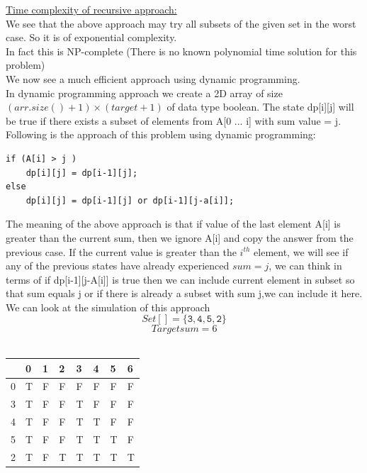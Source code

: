 \documentclass[12pt]{book}
\begin{document}
\underline{Time complexity of recursive approach:}\\
We see that the above approach may try all subsets of the given set in the worst case. So it is of exponential complexity.\\
In fact this is NP-complete (There is no known polynomial time solution for this problem)\\

We now see a much efficient approach using dynamic programming.\\
In dynamic programming approach we create a 2D array of size $(arr.size()+1) \times (target+1)$ of data type boolean. The state dp[i][j] will be true if there exists a subset of elements from A[0 ... i] with sum value = j.\\

Following is the approach of this problem using dynamic programming:\\
\begin{lstlisting}
if (A[i] > j )
    dp[i][j] = dp[i-1][j];
else
    dp[i][j] = dp[i-1][j] or dp[i-1][j-a[i]];
\end{lstlisting}

The meaning of the above approach is that if value of the last element A[i] is greater than the current sum, then we ignore A[i] and copy the answer from the previous case. If the current value is greater than the $i^{th}$ element, we will see if any of the previous states have already experienced $sum=j$, we can think in terms of if dp[i-1][j-A[i]] is true then we can include current element in subset so that sum equals j or if there is already a subset with sum j,we can include it here.\\

We can look at the simulation of this approach\\
\[Set[] = \mathtt{\{3, 4, 5, 2\}}\]
\[Target sum = 6\]\\

\begin{center}
\begin{tabular}{ | m{1cm} | m{1cm}| m{1cm} | m{1cm} | m{1cm} | m{1cm} | m{1cm} | m{1cm} | } 
\hline
  & 0 & 1 & 2 & 3 & 4 & 5 & 6  \\ 
\hline
0 & T & F & F & F & F & F & F  \\
\hline
3 & T & F & F & T & F & F & F \\
\hline
4 & T & F & F & T & T & F & F \\
\hline
5 & T & F & F & T & T & T & F\\
\hline
2 & T & F & T & T & T & T & T\\
\hline
\end{tabular}
\\
\end{center}
\end{document}
